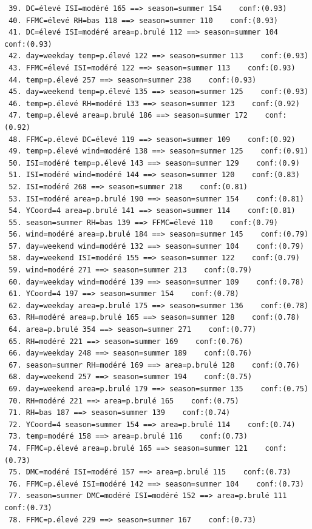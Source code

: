 \documentclass{article}
\begin{document}
\begin{sffamily}
\begin{center}
\begin{verbatim}
 39. DC=élevé ISI=modéré 165 ==> season=summer 154    conf:(0.93)
 40. FFMC=élevé RH=bas 118 ==> season=summer 110    conf:(0.93)
 41. DC=élevé ISI=modéré area=p.brulé 112 ==> season=summer 104    conf:(0.93)
 42. day=weekday temp=p.élevé 122 ==> season=summer 113    conf:(0.93)
 43. FFMC=élevé ISI=modéré 122 ==> season=summer 113    conf:(0.93)
 44. temp=p.élevé 257 ==> season=summer 238    conf:(0.93)
 45. day=weekend temp=p.élevé 135 ==> season=summer 125    conf:(0.93)
 46. temp=p.élevé RH=modéré 133 ==> season=summer 123    conf:(0.92)
 47. temp=p.élevé area=p.brulé 186 ==> season=summer 172    conf:(0.92)
 48. FFMC=p.élevé DC=élevé 119 ==> season=summer 109    conf:(0.92)
 49. temp=p.élevé wind=modéré 138 ==> season=summer 125    conf:(0.91)
 50. ISI=modéré temp=p.élevé 143 ==> season=summer 129    conf:(0.9)
 51. ISI=modéré wind=modéré 144 ==> season=summer 120    conf:(0.83)
 52. ISI=modéré 268 ==> season=summer 218    conf:(0.81)
 53. ISI=modéré area=p.brulé 190 ==> season=summer 154    conf:(0.81)
 54. YCoord=4 area=p.brulé 141 ==> season=summer 114    conf:(0.81)
 55. season=summer RH=bas 139 ==> FFMC=élevé 110    conf:(0.79)
 56. wind=modéré area=p.brulé 184 ==> season=summer 145    conf:(0.79)
 57. day=weekend wind=modéré 132 ==> season=summer 104    conf:(0.79)
 58. day=weekend ISI=modéré 155 ==> season=summer 122    conf:(0.79)
 59. wind=modéré 271 ==> season=summer 213    conf:(0.79)
 60. day=weekday wind=modéré 139 ==> season=summer 109    conf:(0.78)
 61. YCoord=4 197 ==> season=summer 154    conf:(0.78)
 62. day=weekday area=p.brulé 175 ==> season=summer 136    conf:(0.78)
 63. RH=modéré area=p.brulé 165 ==> season=summer 128    conf:(0.78)
 64. area=p.brulé 354 ==> season=summer 271    conf:(0.77)
 65. RH=modéré 221 ==> season=summer 169    conf:(0.76)
 66. day=weekday 248 ==> season=summer 189    conf:(0.76)
 67. season=summer RH=modéré 169 ==> area=p.brulé 128    conf:(0.76)
 68. day=weekend 257 ==> season=summer 194    conf:(0.75)
 69. day=weekend area=p.brulé 179 ==> season=summer 135    conf:(0.75)
 70. RH=modéré 221 ==> area=p.brulé 165    conf:(0.75)
 71. RH=bas 187 ==> season=summer 139    conf:(0.74)
 72. YCoord=4 season=summer 154 ==> area=p.brulé 114    conf:(0.74)
 73. temp=modéré 158 ==> area=p.brulé 116    conf:(0.73)
 74. FFMC=p.élevé area=p.brulé 165 ==> season=summer 121    conf:(0.73)
 75. DMC=modéré ISI=modéré 157 ==> area=p.brulé 115    conf:(0.73)
 76. FFMC=p.élevé ISI=modéré 142 ==> season=summer 104    conf:(0.73)
 77. season=summer DMC=modéré ISI=modéré 152 ==> area=p.brulé 111    conf:(0.73)
 78. FFMC=p.élevé 229 ==> season=summer 167    conf:(0.73)

\end{verbatim}
\end{center}
\end{sffamily}
\end{document}
